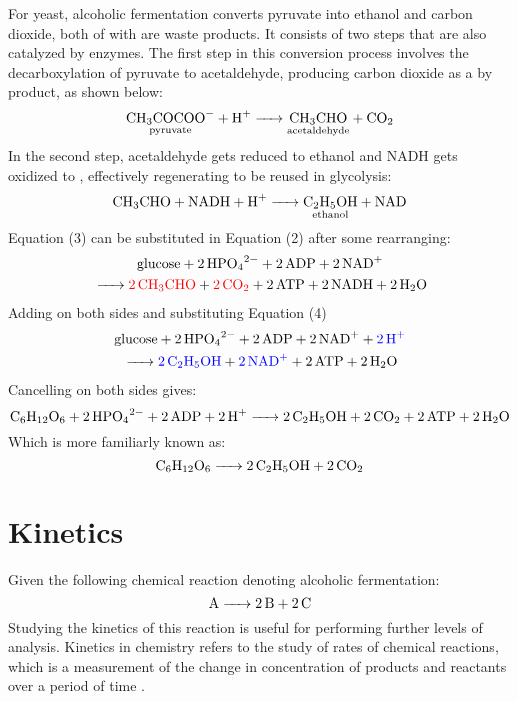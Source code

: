 \documentclass[12pt]{article}
\begin{document}
\medskip

For yeast, alcoholic fermentation converts pyruvate into ethanol and carbon dioxide, both of with are waste products. It consists of two steps that are also catalyzed by enzymes. The first step in this conversion process involves the decarboxylation of pyruvate to acetaldehyde, producing carbon dioxide as a by product, as shown below:
\begin{equation}
    \ce{\underset{\text{pyruvate}}{\ce{CH3COCOO-}} + H+ -> \underset{\text{acetaldehyde}}{\ce{CH3CHO}} + CO2}
\end{equation}
In the second step, acetaldehyde gets reduced to ethanol and NADH gets oxidized to , effectively regenerating  to be reused in glycolysis:
\begin{equation}
    \ce{CH3CHO + NADH + H+ -> \underset{\text{ethanol}}{\ce{C2H5OH}} + NAD}
\end{equation}
Equation (3) can be substituted in Equation (2) after some rearranging:
\begin{multline*}
    \ce{glucose + 2HPO4^{2-} + 2ADP + 2NAD+ \\-> \textcolor{red}{\ce{2CH3CHO}} + \textcolor{red}{\ce{2CO2}} + 2ATP + 2NADH + 2H2O}
\end{multline*}
Adding  on both sides and substituting Equation (4)
\begin{multline*}
    \ce{glucose + 2HPO4^{2-} + 2ADP + 2NAD+ + \textcolor{blue}{\ce{2H+}} \\-> \textcolor{blue}{\ce{2C2H5OH}} + \textcolor{blue}{\ce{2NAD+}} + 2ATP + 2H2O}
\end{multline*}
Cancelling  on both sides gives:
\begin{equation}
    \ce{C6H12O6 + 2HPO4^{2-} + 2ADP + 2H+ -> 2C2H5OH + 2CO2 + 2ATP + 2H2O}
\end{equation}
Which is more familiarly known as:
\begin{equation}
    \ce{C6H12O6 -> 2C2H5OH + 2CO2}
\end{equation}

\section{Kinetics}  %
Given the following chemical reaction denoting alcoholic fermentation:
\begin{equation}
    \ce{A -> 2B + 2C}
\end{equation}
Studying the kinetics of this reaction is useful for performing further levels of analysis. Kinetics in chemistry refers to the study of rates of chemical reactions, which is a measurement of the change in concentration of products and reactants over a period of time \parencite{ref}.
\end{document}

